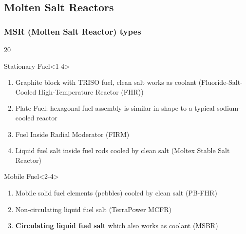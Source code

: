 \subsection{Molten Salt Reactors}


\begin{frame}
\frametitle{MSR (Molten Salt Reactor) types}
\begin{overlayarea}{\linewidth}{20\baselineskip}
\begin{block}{Stationary Fuel}<1-4>
	\begin{enumerate}
		\item Graphite block with TRISO fuel, clean salt works as 
		coolant (Fluoride-Salt-Cooled High-Temperature 
		Reactor (FHR))
		\item Plate Fuel: hexagonal fuel assembly is similar in shape to a typical sodium-cooled reactor
		\item Fuel Inside Radial Moderator (FIRM)
		\item Liquid fuel salt inside fuel rods cooled by clean salt 
		(Moltex Stable Salt Reactor)
	\end{enumerate}
\end{block}

\begin{block}{Mobile Fuel}<2-4>
	\begin{enumerate}
		\item<2-4> Mobile solid fuel elements (pebbles) cooled by 
		clean salt (PB-FHR)
		\item<3-4> Non-circulating liquid fuel salt (TerraPower \gls{MCFR}) 
		\item<4> \textbf{Circulating liquid fuel salt} which also works 
		as coolant (\gls{MSBR})
	\end{enumerate}
\end{block}
\end{overlayarea}
\end{frame}



